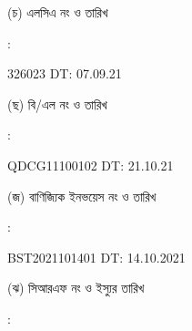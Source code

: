 \documentclass[12pt]{article}
\newcommand{\blno}{QDCG11100102}
\newcommand{\bldt}{21.10.21}
\newcommand{\lcano}{326023}
\newcommand{\lcadt}{07.09.21}
\newcommand{\invno}{BST2021101401}
\newcommand{\invdt}{14.10.2021}
\begin{document}
\begin{minipage}[t]{0.05\linewidth}
\hspace*{1em}
\end{minipage}
\begin{minipage}[t]{0.40\linewidth}
(চ) এলসিএ নং ও তারিখ
\end{minipage}
\begin{minipage}[t]{0.02\linewidth}
:
\end{minipage}
\begin{minipage}[t]{0.53\linewidth}
{\lcano} \hspace{2em} DT: {\lcadt}
\\
\end{minipage}
\begin{minipage}[t]{0.05\linewidth}
\hspace*{1em}
\end{minipage}
\begin{minipage}[t]{0.40\linewidth}
(ছ) বি/এল নং ও তারিখ
\end{minipage}
\begin{minipage}[t]{0.02\linewidth}
:
\end{minipage}
\begin{minipage}[t]{0.53\linewidth}
{\blno} \hspace{2em} DT: {\bldt}
\\
\end{minipage}
\begin{minipage}[t]{0.05\linewidth}
\hspace*{1em}
\end{minipage}
\begin{minipage}[t]{0.40\linewidth}
(জ) বাণিজ্যিক ইনভয়েস নং ও তারিখ
\end{minipage}
\begin{minipage}[t]{0.02\linewidth}
:
\end{minipage}
\begin{minipage}[t]{0.53\linewidth}
{\invno} \hspace{2em} DT: {\invdt}
\\
\end{minipage}
\begin{minipage}[t]{0.05\linewidth}
\hspace*{1em}
\end{minipage}
\begin{minipage}[t]{0.40\linewidth}
(ঝ) সিআরএফ নং ও ইস্যুর তারিখ
\end{minipage}
\begin{minipage}[t]{0.02\linewidth}
:
\end{minipage}
\end{document}
